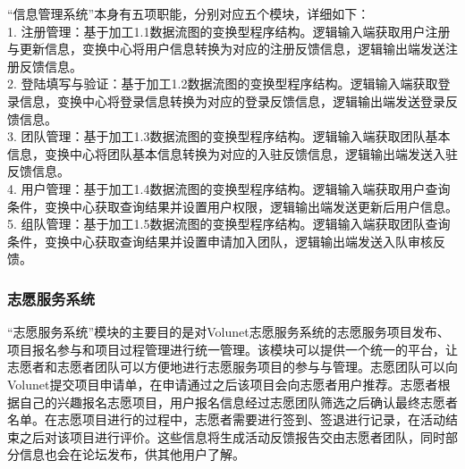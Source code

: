 “信息管理系统”本身有五项职能，分别对应五个模块，详细如下：\\
1. 注册管理：基于加工1.1数据流图的变换型程序结构。逻辑输入端获取用户注册与更新信息，变换中心将用户信息转换为对应的注册反馈信息，逻辑输出端发送注册反馈信息。\\
2. 登陆填写与验证：基于加工1.2数据流图的变换型程序结构。逻辑输入端获取登录信息，变换中心将登录信息转换为对应的登录反馈信息，逻辑输出端发送登录反馈信息。\\
3. 团队管理：基于加工1.3数据流图的变换型程序结构。逻辑输入端获取团队基本信息，变换中心将团队基本信息转换为对应的入驻反馈信息，逻辑输出端发送入驻反馈信息。\\
4. 用户管理：基于加工1.4数据流图的变换型程序结构。逻辑输入端获取用户查询条件，变换中心获取查询结果并设置用户权限，逻辑输出端发送更新后用户信息。\\
5. 组队管理：基于加工1.5数据流图的变换型程序结构。逻辑输入端获取团队查询条件，变换中心获取查询结果并设置申请加入团队，逻辑输出端发送入队审核反馈。\\

\begin{landscape}
    \begin{figure}[bp]
        \end{figure}
\end{landscape}

\subsubsection{志愿服务系统}

“志愿服务系统”模块的主要目的是对Volunet志愿服务系统的志愿服务项目发布、项目报名参与和项目过程管理进行统一管理。该模块可以提供一个统一的平台，让志愿者和志愿者团队可以方便地进行志愿服务项目的参与与管理。志愿团队可以向Volunet提交项目申请单，在申请通过之后该项目会向志愿者用户推荐。志愿者根据自己的兴趣报名志愿项目，用户报名信息经过志愿团队筛选之后确认最终志愿者名单。在志愿项目进行的过程中，志愿者需要进行签到、签退进行记录，在活动结束之后对该项目进行评价。这些信息将生成活动反馈报告交由志愿者团队，同时部分信息也会在论坛发布，供其他用户了解。 

